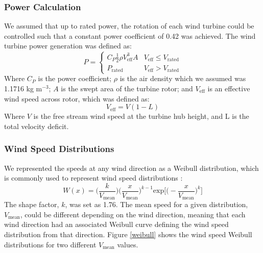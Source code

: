 \subsubsection{Power Calculation}
We assumed that up to rated power, the rotation of each wind turbine could be controlled such that a constant power coefficient of 0.42 was achieved. The wind turbine power generation was defined as:
\begin{equation}
P = 
\begin{cases} 
      C_P\frac{1}{2}\rho V_{\text{eff}}^3A & V_{\text{eff}}\leq V_{\text{rated}} \\
      P_{\text{rated}} & V_{\text{eff}} > V_{\text{rated}}
   \end{cases}
\end{equation}
\noindent Where $C_P$ is the power coefficient; $\rho$ is the air density which we assumed was 1.1716 kg m$^{-3}$; $A$ is the swept area of the turbine rotor; and $V_{\text{eff}}$ is an effective wind speed across rotor, which was defined as:
\begin{equation}
V_{\text{eff}} = V(1-L)
\end{equation}
\noindent Where $V$ is the free stream wind speed at the turbine hub height, and L is the total velocity deficit.


\subsubsection{Wind Speed Distributions}

We represented the speeds at any wind direction as a Weibull distribution, which is commonly used to represent wind speed distributions \citep{justus1978methods,rehman1994weibull,dorvlo2002estimating}: 
\begin{equation}
W(x) = \Big(\frac{k}{V_{\text{mean}}}\Big)\Big(\frac{x}{V_{\text{mean}}}\Big)^{k-1}\text{exp}\Big[\Big(-\frac{x}{V_{\text{mean}}}\Big)^k\Big]
\end{equation}
The shape factor, $k$, was set as 1.76. 
The mean speed for a given distribution, $V_{\text{mean}}$, could be different depending on the wind direction, meaning that each wind direction had an associated Weibull curve defining the wind speed distribution from that direction. 
Figure \ref{weibull} shows the wind speed Weibull distributions for two different $V_{\text{mean}}$ values. 



